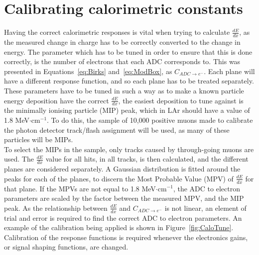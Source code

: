 \section{Calibrating calorimetric constants} \label{sec:MCCalib} %
Having the correct calorimetric responses is vital when trying to calculate $\frac{dE}{dx}$, as the measured change in charge has to be correctly converted to the change in energy. The parameter which has to be tuned in order to ensure that this is done correctly, is the number of electrons that each ADC corresponds to. This was presented in Equations~\ref{eq:Birks} and~\ref{eq:ModBox}, as $C_{ADC \rightarrow e^{-}}$. Each plane will have a different response function, and so each plane has to be treated separately. These parameters have to be tuned in such a way as to make a known particle energy deposition have the correct $\frac{dE}{dx}$, the easiest deposition to tune against is the minimally ionising particle (MIP) peak, which in LAr should have a value of 1.8 MeV$\cdot$cm$^{-1}$. To do this, the sample of 10,000 positive muons made to calibrate the photon detector track/flash assignment will be used, as many of these particles will be MIPs. \\

To select the MIPs in the sample, only tracks caused by through-going muons are used. The $\frac{dE}{dx}$ value for all hits, in all tracks, is then calculated, and the different planes are considered separately. A Gaussian distribution is fitted around the peaks for each of the planes, to discern the Most Probable Value (MPV) of $\frac{dE}{dx}$ for that plane. If the MPVs are not equal to 1.8 MeV$\cdot$cm$^{-1}$, the ADC to electron parameters are scaled by the factor between the measured MPV, and the MIP peak. As the relationship between $\frac{dE}{dx}$ and $C_{ADC \rightarrow e^{-}}$ is not linear, an element of trial and error is required to find the correct ADC to electron parameters. An example of the calibration being applied is shown in Figure~\ref{fig:CaloTune}. Calibration of the response functions is required whenever the electronics gains, or signal shaping functions, are changed.

